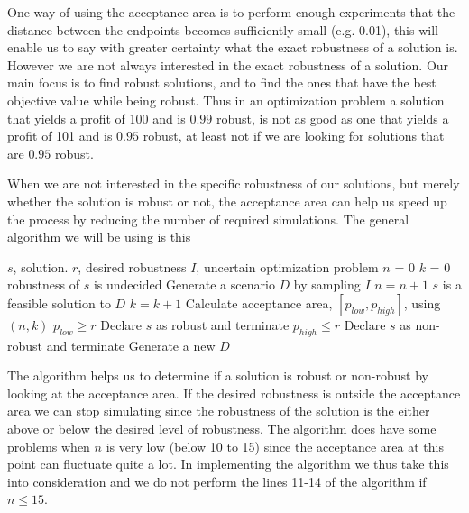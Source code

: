 One way of using the acceptance area is to perform enough experiments
that the distance between the endpoints becomes sufficiently small
(e.g. 0.01), this will enable us to say with greater
certainty what the exact robustness of a solution is.
However we are not always interested in the exact robustness of a
solution. Our main focus is to find robust solutions, and to find the
ones that have the best objective value while being robust. Thus in
an optimization problem a solution that yields a profit of 100 and is
$0.99$ robust, is not as good as one that yields a profit of 101 and
is $0.95$ robust, at least not if we are looking for solutions that
are $0.95$ robust.

When we are not interested in the specific robustness of our
solutions, but merely whether the solution is robust or not, the
acceptance area can help us speed up the process by reducing the
number of required simulations.
The general algorithm we will be using is this
\begin{codebox}
\li $s$, solution.
\li $r$, desired robustness
\li $I$, uncertain optimization problem
\li $n$ = 0
\li $k$ = 0
\li \Do \While robustness of $s$ is undecided
\li Generate a scenario $D$ by sampling $I$
\li $n = n + 1$
\li \If $s$ is a feasible solution to $D$
\li \Do $k = k + 1$ 
\End
\li Calculate acceptance area, $[p_{low}, p_{high}]$, using $(n,k)$
\li \If $p_{low} \geq r$
\li \Do Declare $s$ as robust and terminate
\End%
\li \If $p_{high} \leq r$
\li \Do Declare $s$ as non-robust and terminate
\End%
\li Generate a new $D$
\End%
\label{alg:decide_robustness}
\end{codebox}

The algorithm helps us to determine if a solution is robust or
non-robust by looking at the acceptance area. If the desired
robustness is outside the acceptance area we can stop simulating since
the robustness of the solution is the either above or below the
desired level of robustness. The algorithm does have some problems
when $n$ is very low (below 10 to 15) since the acceptance area at
this point can fluctuate quite a lot. In implementing the algorithm we
thus take this into consideration and we do not perform the lines
11-14 of the algorithm if $n\leq 15$.
